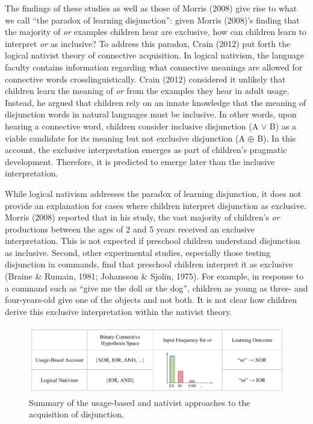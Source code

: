 \documentclass[floatsintext,man]{apa6}
\theoremstyle{definition}
\theoremstyle{definition}
\theoremstyle{definition}
\theoremstyle{remark}
\begin{document}
The findings of these studies as well as those of Morris (2008) give
rise to what we call \enquote{the paradox of learning disjunction}:
given Morris (2008)'s finding that the majority of \emph{or} examples
children hear are exclusive, how can children learn to interpret
\emph{or} as inclusive? To address this paradox, Crain (2012) put forth
the logical nativist theory of connective acquisition. In logical
nativism, the language faculty contains information regarding what
connective meanings are allowed for connective words
crosslinguistically. Crain (2012) considered it unlikely that children
learn the meaning of \emph{or} from the examples they hear in adult
usage. Instead, he argued that children rely on an innate knowledge that
the meaning of disjunction words in natural languages must be inclusive.
In other words, upon hearing a connective word, children consider
inclusive disjunction (A \(\vee\) B) as a viable candidate for its
meaning but not exclusive disjunction (A \(\oplus\) B). In this account,
the exclusive interpretation emerges as part of children's pragmatic
development. Therefore, it is predicted to emerge later than the
inclusive interpretation.

While logical nativism addresses the paradox of learning disjunction, it
does not provide an explanation for cases where children interpret
disjunction as exclusive. Morris (2008) reported that in his study, the
vast majority of children's \emph{or} productions between the ages of 2
and 5 years received an exclusive interpretation. This is not expected
if preschool children understand disjunction as inclusive. Second, other
experimental studies, especially those testing disjunction in commands,
find that preschool children interpret it as exclusive (Braine \&
Rumain, 1981; Johansson \& Sjolin, 1975). For example, in response to a
command such as \enquote{give me the doll or the dog}, children as young
as three- and four-years-old give one of the objects and not both. It is
not clear how children derive this exclusive interpretation within the
nativist theory.

\begin{figure}[tb]

{\centering \includegraphics{figs/theories-1} 

}

\caption{Summary of the usage-based and nativist approaches to the acquisition of disjunction.}\label{fig:theories}
\end{figure}
\end{document}
